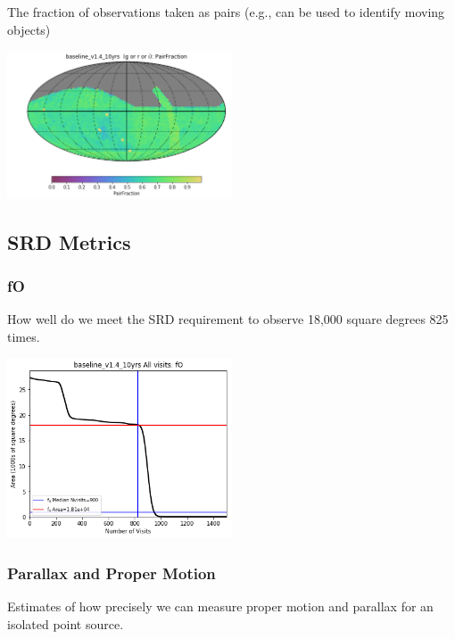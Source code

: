 {The fraction of observations taken as pairs (e.g., can be used to identify moving objects)

\includegraphics[width=0.5\textwidth]{metric_summary/glance/thumb.baseline_v1_4_10yrs_PairFraction_g_or_r_or_i_HEAL_SkyMap.png}

\subsection{SRD Metrics}

\subsubsection{fO}

How well do we meet the SRD requirement to observe 18,000 square degrees 825 times.

\includegraphics[width=0.5\textwidth]{metric_summary/glance/thumb.baseline_v1_4_10yrs_fO_All_visits_HEAL_FO.png}


\subsubsection{Parallax and Proper Motion}

Estimates of how precisely we can measure proper motion and parallax for an isolated point source.

}

